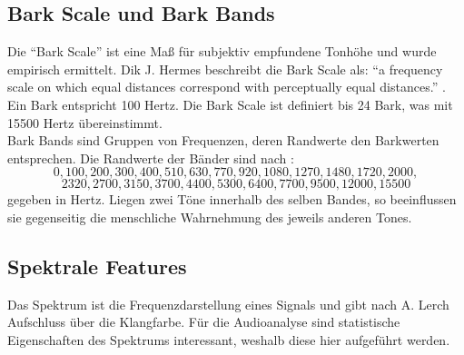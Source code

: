 \documentclass[11pt,a4paper]{article}
\begin{document}
\subsection{Bark Scale und Bark Bands}
Die ``Bark Scale'' ist eine Maß für subjektiv empfundene Tonhöhe und wurde empirisch ermittelt. Dik J. Hermes beschreibt die Bark Scale als: ``a frequency scale on which equal distances correspond with perceptually equal distances.'' \cite{BBands}. Ein Bark entspricht 100 Hertz. Die Bark Scale ist definiert bis 24 Bark, was mit 15500 Hertz übereinstimmt.\\
Bark Bands sind Gruppen von Frequenzen, deren Randwerte den Barkwerten entsprechen. Die Randwerte der Bänder sind nach \cite[S. 3]{smith1999bark}:
\[0, 100, 200, 300, 400, 510, 630, 770, 920, 1080, 1270, 1480, 1720, 2000, \]
\[2320, 2700, 3150, 3700, 4400, 5300, 6400, 7700, 9500, 12 000, 15 500\]
gegeben in Hertz. Liegen zwei Töne innerhalb des selben Bandes, so beeinflussen sie gegenseitig die menschliche Wahrnehmung des jeweils anderen Tones.

\subsection{Spektrale Features}
Das Spektrum ist die Frequenzdarstellung eines Signals und gibt nach A. Lerch \cite[S. 41]{lerch2012introduction} Aufschluss über die Klangfarbe. Für die Audioanalyse sind statistische Eigenschaften des Spektrums interessant, weshalb diese hier aufgeführt werden.
\end{document}
